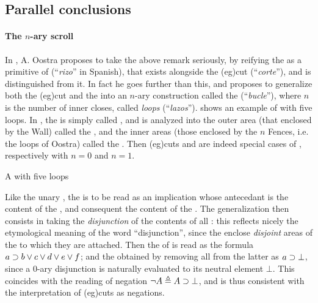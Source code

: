 \begin{scope}
\subsection{Parallel conclusions}

\paragraph{The $n$-ary scroll}

\AP
In \cite{oostra_graficos_2010}, A. Oostra proposes to take the above remark
seriously, by reifying the  as a primitive  of 
(``\emph{rizo}'' in Spanish), that exists alongside the \kl(eg){cut}
(``\emph{corte}''), and is distinguished from it. In fact he goes further than
this, and proposes to generalize both the \kl(eg){cut} and the  into
an $n$-ary construction called the  (``\emph{bucle}''), where $n$ is
the number of inner closes, called \emph{loops} (``\emph{lazos}'').
 shows an example of  with five loops. In
\cite{minghui_graphical_2019}, the  is simply called , and is analyzed into the outer area (that enclosed by the Wall) called
the , and the inner areas (those enclosed by the $n$ Fences, i.e.
the loops of Oostra) called the . Then \kl(eg){cuts} and
 are indeed special cases of , respectively with
$n = 0$ and $n = 1$.

\begin{marginfigure}
  \caption{A  with five loops}
\end{marginfigure}

Like the unary , the  is to be read as an
implication whose antecedant is the content of the , and consequent the
content of the . The generalization then consists in taking the
\emph{disjunction} of the contents of all : this reflects nicely the
etymological meaning of the word ``disjunction'', since the  enclose
\emph{disjoint} areas of the  to which they are attached. Then the
 of  is read as the
formula $a \supset b \lor c \lor d \lor e \lor f$; and the  obtained by removing all  from the latter as $a
\supset \bot$, since a $0$-ary disjunction is naturally evaluated to its neutral
element $\bot$. This coincides with the  reading of negation
$\neg A \triangleq A \supset \bot$, and is thus consistent with the interpretation of
\kl(eg){cuts} as negations.


\end{scope}
